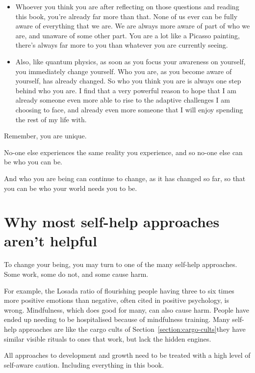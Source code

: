 \begin{itemize}
\item Whoever you think you are after reflecting on those questions and reading this book, you're already far more than that. None of us ever can be fully aware of everything that we are. We are always more aware of part of who we are, and unaware of some other part. You are a lot like a Picasso painting, there's always far more to you than whatever you are currently seeing.
\item Also, like quantum physics, as soon as you focus your awareness on yourself, you immediately change yourself. Who you are, as you become aware of yourself, has already changed. So who you think you are is always one step behind who you are. I find that a very powerful reason to hope that I am already someone even more able to rise to the adaptive challenges I am choosing to face, and already even more someone that I will enjoy spending the rest of my life with.
\end{itemize}


Remember, you are unique. 


No-one else experiences the same reality you experience, and so no-one else can be who you can be. 


And who you are being can continue to change, as it has changed so far, so that you can be who your world needs you to be.


\section{Why most self-help approaches aren’t helpful}
\label{section:empiricism}


To change your being, you may turn to one of the many self-help approaches. Some work, some do not, and some cause harm. 


For example, the Losada ratio of flourishing people having three to six times more positive emotions than negative, often cited in positive psychology, is wrong\cite{sokal-losada-wrong}. Mindfulness, which does good for many, can also cause harm\cite{farias-buddha}. People have ended up needing to be hospitalised because of mindfulness training. Many self-help approaches are like the cargo cults of Section~\ref{section:cargo-cults}\textemdash they have similar visible rituals to ones that work, but lack the hidden engines.


All approaches to development and growth need to be treated with a high level of self-aware caution. Including everything in this book. 


